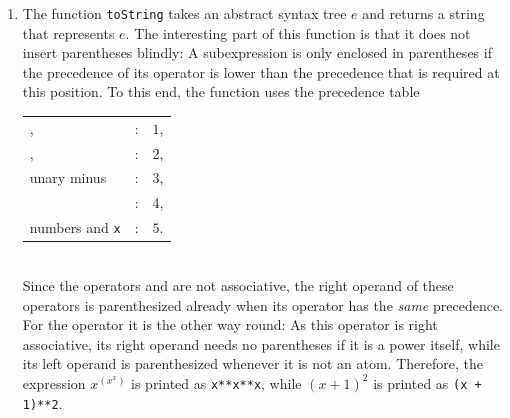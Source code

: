 \begin{enumerate}
\begin{enumerate}
            $\ln\bigl(\exp(a)\bigr) \rightarrow a$, \quad
            $\exp(0) \rightarrow 1$, \quad
            $\exp\bigl(\ln(a)\bigr) \rightarrow a$,
            \\[0.1cm]
            $\exp\bigl(a \cdot \ln(f)\bigr) \rightarrow f^{a}$.
            \\[0.1cm]
            The last of these rules undoes the rewriting that the function \texttt{diff} has performed in
            order to differentiate the operator \squoted{**}.
      \item \textbf{Derivatives of powers}:  These rules clean up the expressions that are produced when a
            power is differentiated.  For a number $c$ we have
            \\[0.1cm]
            $\ds a \cdot \frac{1}{f} \cdot f^{c} \rightarrow a \cdot f^{\,c-1}$
            \qquad and \qquad
            $\ds \frac{1}{f} \cdot f^{c} \rightarrow f^{\,c-1}$.
            \\[0.1cm]
            In the special case $c = 2$ the results are simplified further to $a \cdot f$ and $f$,
            respectively.
      \end{enumerate}
\item The function \texttt{toString} takes an abstract syntax tree $e$ and returns a string that
      represents $e$.  The interesting part of this function is that it does not insert parentheses
      blindly:  A subexpression is only enclosed in parentheses if the precedence of its operator is lower
      than the precedence that is required at this position.  To this end, the function uses the
      precedence table
      \\[0.2cm]
      \hspace*{1.3cm}
      \begin{tabular}{lcl}
        \squoted{+}, \squoted{-} & : & $1$, \\
        \squoted{*}, \squoted{/} & : & $2$, \\
        unary minus              & : & $3$, \\
        \squoted{**}             & : & $4$, \\
        numbers and \texttt{x}   & : & $5$.
      \end{tabular}
      \\[0.2cm]
      Since the operators \squoted{-} and \squoted{/} are not associative, the right operand of these
      operators is parenthesized already when its operator has the \emph{same} precedence.  For the
      operator \squoted{**} it is the other way round:  As this operator is right associative, its right
      operand needs no parentheses if it is a power itself, while its left operand is parenthesized
      whenever it is not an atom.  Therefore, the expression $x^{\left(x^x\right)}$ is printed as
      \texttt{x**x**x}, while $(x+1)^2$ is printed as \texttt{(x + 1)**2}.
\end{enumerate}

